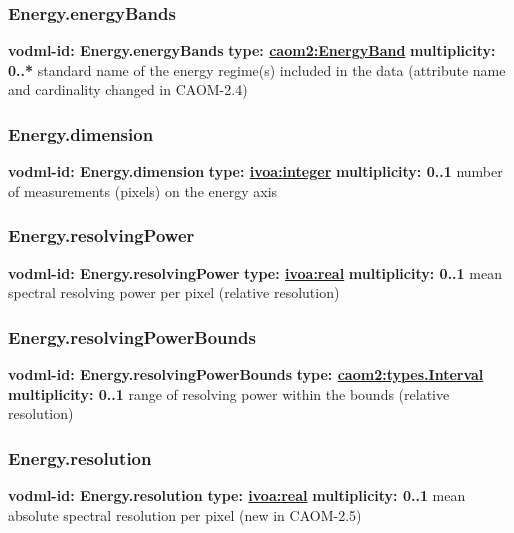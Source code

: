     \subsubsection{Energy.energyBands}
      \textbf{vodml-id: Energy.energyBands} \newline
      \textbf{type: \hyperref[sect:EnergyBand]{caom2:EnergyBand}} \newline
      \textbf{multiplicity: 0..*} \newline
      standard name of the energy regime(s) included in the data (attribute name and cardinality changed in CAOM-2.4)

    \subsubsection{Energy.dimension}
      \textbf{vodml-id: Energy.dimension} \newline
      \textbf{type: \hyperref[sect:ivoa]{ivoa:integer}} \newline
      \textbf{multiplicity: 0..1} \newline
      number of measurements (pixels) on the energy axis

    \subsubsection{Energy.resolvingPower}
      \textbf{vodml-id: Energy.resolvingPower} \newline
      \textbf{type: \hyperref[sect:ivoa]{ivoa:real}} \newline
      \textbf{multiplicity: 0..1} \newline
      mean spectral resolving power per pixel (relative resolution)

    \subsubsection{Energy.resolvingPowerBounds}
      \textbf{vodml-id: Energy.resolvingPowerBounds} \newline
      \textbf{type: \hyperref[sect:types.Interval]{caom2:types.Interval}} \newline
      \textbf{multiplicity: 0..1} \newline
      range of resolving power within the bounds (relative resolution)

    \subsubsection{Energy.resolution}
      \textbf{vodml-id: Energy.resolution} \newline
      \textbf{type: \hyperref[sect:ivoa]{ivoa:real}} \newline
      \textbf{multiplicity: 0..1} \newline
      mean absolute spectral resolution per pixel (new in CAOM-2.5)

